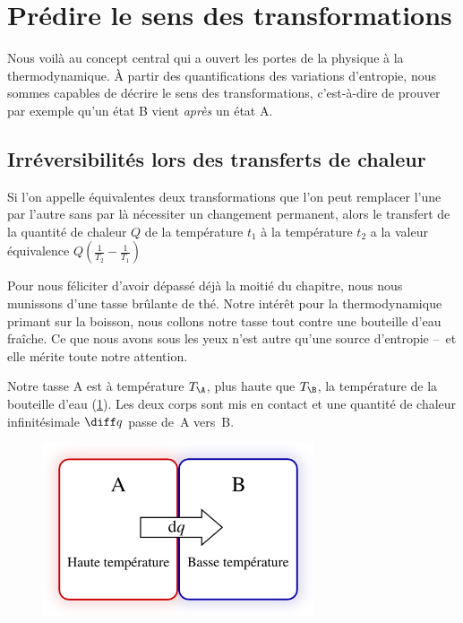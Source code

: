 \onlyframabook{\clearpage}
\section{Prédire le sens des transformations}

	Nous voilà au concept central qui a ouvert les portes de la physique à la thermodynamique. À partir des quantifications des variations d’entropie, nous sommes capables de décrire le sens des transformations, c’est-à-dire de prouver par exemple qu’un état B vient \emph{après} un état A.

	\subsection{Irréversibilités lors des transferts de chaleur}

			Si l’on appelle équivalentes deux transformations que l’on peut remplacer l’une par l’autre sans par là nécessiter un changement permanent, alors \jecourte le transfert de la quantité de chaleur $Q$ de la température $t_1$ à la température $t_2$ a la valeur équivalence $Q \left( \frac{1}{T_2} - \frac{1}{T_1}\right)$ \jecourte
		
		Pour nous féliciter d’avoir dépassé déjà la moitié du chapitre, nous nous munissons d’une tasse brûlante de thé. Notre intérêt pour la thermodynamique primant sur la boisson, nous collons notre tasse tout contre une bouteille d’eau fraîche. Ce que nous avons sous les yeux n’est autre qu’une source d’entropie --\ et elle mérite toute notre attention.

		Notre tasse A est à température $T_\A$, plus haute que $T_\B$, la température de la bouteille d’eau (\cref{fig_expérience_création_entropie}). Les deux corps sont mis en contact et une quantité de chaleur infinitésimale $\diff q$ passe de~A vers~B.

		\begin{figure}
			\begin{center}
				\includegraphics[width=8cm]{images/transfert_chaleur_irreversible.png}
			\end{center}
			\label{fig_expérience_création_entropie}
		\end{figure}


